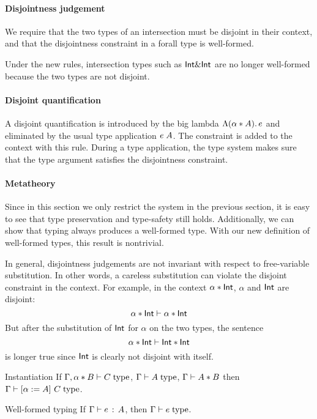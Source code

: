 \paragraph{Disjointness judgement}

We require that the two types of an intersection must be disjoint in their
context, and that the disjointness constraint in a forall type is well-formed.

Under the new rules, intersection types such as $\textsf{Int} \& \textsf{Int}$ are no
longer well-formed because the two types are not disjoint.

\paragraph{Disjoint quantification} A disjoint quantification is introduced by
the big lambda $\Lambda (\alpha * A).\, e$ and eliminated by the usual type
application $e \; A$. The constraint is added to the context with this rule.
During a type application, the type system makes sure that the type argument
satisfies the disjointness constraint.

\paragraph{Metatheory} Since in this section we only restrict the system in the
previous section, it is easy to see that type preservation and type-safety still
holds. Additionally, we can show that typing always produces a well-formed type.
With our new definition of well-formed types, this result is nontrivial.

In general, disjointness judgements are not invariant with respect to
free-variable substitution. In other words, a careless substitution can violate
the disjoint constraint in the context. For example, in the context $\alpha
* \textsf{Int}$, $\alpha$ and $\textsf{Int}$ are disjoint:
\[ \alpha * \textsf{Int} \vdash \alpha * \textsf{Int} \]
But after the substitution of $\textsf{Int}$ for $\alpha$ on the two types, the sentence
\[ \alpha * \textsf{Int} \vdash \textsf{Int} * \textsf{Int} \]
is longer true since $\textsf{Int}$ is clearly not disjoint with itself.

\begin{lemma}{Instantiation} \label{instantiation}
  If $\Gamma, \alpha * B \vdash C \; \text{type}$, $\Gamma \vdash A \; \text{type}$, $\Gamma \vdash A * B$ then $\Gamma \vdash \lbrack \alpha := A \rbrack~ C \; \text{type}$.
\end{lemma}

\begin{lemma}{Well-formed typing} \label{wf-typing}
If $\Gamma \vdash e \ \!:\! \ A$, then $\Gamma \vdash e \; \text{type}$.
\end{lemma}

